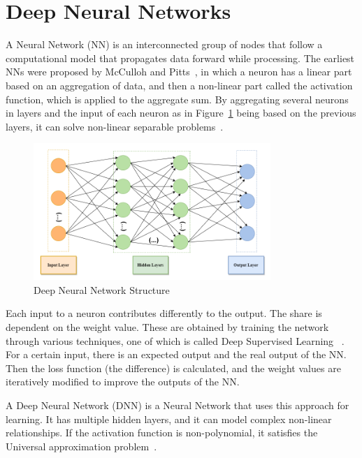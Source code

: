\section{Deep Neural Networks}
\label{section:cnn}



A Neural Network (NN) is an interconnected group of nodes that follow a
computational model that propagates data forward while processing. The earliest
NNs were proposed by McCulloh and Pitts~\cite{neuron:model}, in which a neuron
has a linear part based on an aggregation of data, and then a non-linear part
called the activation function, which is applied to the aggregate sum. By aggregating several neurons in layers and the input of
each neuron as in Figure~\ref{MLP} being based on the previous layers, it can solve non-linear separable problems~\cite{approximation:problem}.

\begin{figure}[!htbp]
    \centering
    \includegraphics[width=0.8\textwidth]{Figures/mlp.png}
    \caption{Deep Neural Network Structure}
    \label{MLP}
\end{figure} 

Each input to a neuron contributes differently to the output. The share is
dependent on the weight value. These are obtained by training the network
through various techniques, one of which is called Deep Supervised
Learning~\cite{deeplearning} . For a certain input, there is an expected output
and the real output of the NN. Then the loss function (the difference) is
calculated, and the weight values are iteratively modified to improve the
outputs of the NN.

A Deep Neural Network (DNN) is a Neural Network that uses this approach for
learning. It has multiple hidden layers, and it can model complex non-linear
relationships. If the activation function is non-polynomial, it satisfies the
Universal approximation problem~\cite{approximation:problem}.

